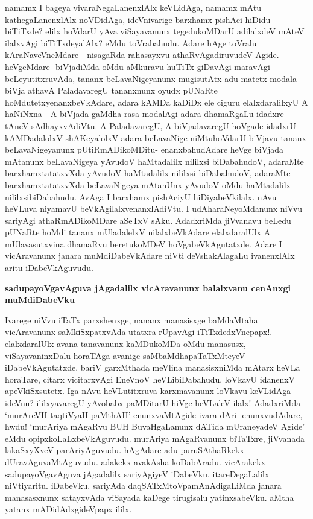 namamx I bageya vivaraNegaLanenxlAlx keVLidAga, namamx mAtu kathegaLanenxlAlx noVDidAga, ideVnivarige barxhamx pishAci hiDidu biTiTxde? elilx hoVdarU yAva viSayavanunx tegedukoMDarU adilalxdeV mAteV ilalxvAgi biTiTxdeyalAlx? eMdu toVrabahudu. Adare hAge toVralu kAraNaveVneMdare - nisagaRda rahasayxvu athaRvAgadiruvudeV Agide. heVgeMdare- biVjadiMda oMdu aMkuravu huTiTx giDavAgi maravAgi beLeyutitxruvAda, tananx beLavaNigeyanunx mugisutAtx adu matetx modala biVja athavA PaladavaregU tananxnunx oyudx pUNaRte hoMdutetxyenanxbeVkAdare, adara kAMDa kaDiDx ele ciguru elalxdaralilxyU A haNiNxna - A biVjada gaMdha rasa modalAgi adara dhamaRgaLu idadxre tAneV sAdhayxvAdiVtu. A PaladavaregU, A biVjadavaregU hoVgade idadxrU kAMDadalolxV shAKeyalolxV adara beLavaNige niMtuhoVdarU biVjavu tananx beLavaNigeyanunx pUtiRmADikoMDitu- enanxbahudAdare heVge biVjada mAtanunx beLavaNigeya yAvudoV haMtadalilx nililxsi biDabahudoV, adaraMte barxhamxtatatxvXda yAvudoV haMtadalilx nililxsi biDabahudoV, adaraMte barxhamxtatatxvXda beLavaNigeya mAtanUnx yAvudoV oMdu haMtadalilx nililxsibiDabahudu. AvAga I barxhamx pishAciyU hiDiyabeVkilalx. nAvu heVLuva niyamavU beVkAgilalxvenanxlAdiVtu. I udAharaNeyoMdanunx niVvu sariyAgi athaRmADikoMDare aSeTxV sAku. AdadxriMda jiVvanavu beLedu pUNaRte hoMdi tananx mUladalelxV nilalxbeVkAdare elalxdaralUlx A mUlavasutxvina dhamaRvu beretukoMDeV hoVgabeVkAgutatxde. Adare I vicAravanunx janara muMdiDabeVkAdare niVti deVshakAlagaLu ivanenxlAlx aritu iDabeVkAguvudu.

\noindent
{\bf\large{sadupayoVgavAguva jAgadalilx vicAravanunx balalxvanu cenAnxgi muMdiDabeVku}}\label{page248}

Ivarege niVvu iTaTx parxshenxge, nananx manasisxge baMdaMtaha vicAravanunx saMkiSxpatxvAda utatxra rUpavAgi iTiTxdedxVnepapx!. elalxdaralUlx avana tanavanunx kaMDukoMDa oMdu manasusx, viSayavaninxDalu horaTAga avanige saMbaMdhapaTaTxMteyeV iDabeVkAgutatxde. bariV garxMthada meVlina manasisxniMda mAtarx heVLa horaTare, citarx vicitarxvAgi EneVnoV heVLibiDabahudu. loVkavU idanenxV apeVkiSxsutetx. Iga nAvu heVLutitxruva karxmavanunx loVkavu keVLidAga ideVnu? ililxyavaregU yAvobabx paMDitarU hiVge heVLaleV ilalx! AdadxriMda `murAreVH taqtiVyaH paMthAH'\label{248} enunxvaMtAgide ivara dAri- enunxvudAdare, hwdu! `murAriya mAgaRvu BUH BuvaHgaLanunx dATida mUraneyadeV Agide' eMdu opipxkoLaLxbeVkAguvudu. murAriya mAgaRvanunx biTaTxre, jiVvanada lakaSxyXveV parAriyAguvudu. hAgAdare adu puruSAthaRkekx dUravAguvaMtAguvudu. adakekx avakAsha koDabAradu. vicArakekx sadupayoVgavAguva jAgadalilx sariyAgiyeV iDabeVku. itareDegaLalilx niVtiyaritu. iDabeVku. sariyAda daqSATxMtoVpamAnAdigaLiMda janara manasasxnunx satayxvAda viSayada kaDege tirugisalu yatinxsabeVku. aMtha yatanx mADidAdxgideVpapx ililx.

